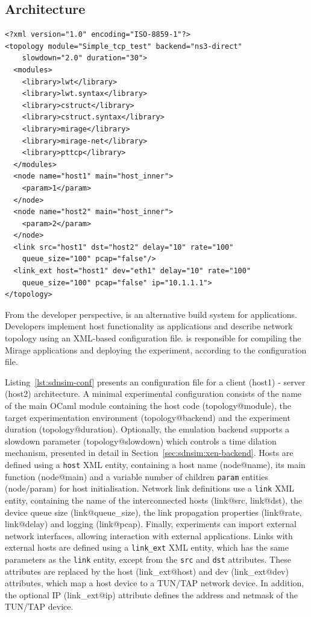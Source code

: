 \subsection{\sdnsim Architecture} \label{sec:sdnsim-design}

\lstset{language=XML,
numberstyle=\footnotesize,
basicstyle=\ttfamily\footnotesize,
captionpos=b,
}
\begin{lstlisting}[caption={A sample \sdnsim configuration file interconnecting
  a server and a client host},label={lst:sdnsim-conf}]
<?xml version="1.0" encoding="ISO-8859-1"?>
<topology module="Simple_tcp_test" backend="ns3-direct" 
    slowdown="2.0" duration="30">
  <modules>
    <library>lwt</library>
    <library>lwt.syntax</library>
    <library>cstruct</library>
    <library>cstruct.syntax</library>
    <library>mirage</library>
    <library>mirage-net</library>
    <library>pttcp</library>
  </modules>
  <node name="host1" main="host_inner"> 
    <param>1</param>
  </node>
  <node name="host2" main="host_inner"> 
    <param>2</param>
  </node>
  <link src="host1" dst="host2" delay="10" rate="100" 
    queue_size="100" pcap="false"/>
  <link_ext host="host1" dev="eth1" delay="10" rate="100" 
    queue_size="100" pcap="false" ip="10.1.1.1">
</topology>
\end{lstlisting}

From the developer perspective, \sdnsim is an alternative build system for
\mirage applications. Developers implement host functionality as \mirage
applications and describe network topology using an XML-based configuration
file. \sdnsim is responsible for compiling the Mirage applications and deploying the
experiment, according to the configuration file. 

Listing~\ref{lst:sdnsim-conf} presents an \sdnsim configuration file for a
client (host1) - server (host2) architecture.  A minimal experimental
configuration consists of the name of the main OCaml module containing the host
code (topology@module), the target experimentation environment
(topology@backend) and the experiment duration (topology@duration).  Optionally,
the emulation backend supports a slowdown parameter (topology@slowdown) which
controls a time dilation mechanism, presented in detail in
Section~\ref{sec:sdnsim:xen-backend}.  Hosts are defined using a \texttt{host}
XML entity, containing a host name (node@name), its main function (node@main)
and a variable number of children \texttt{param} entities (node/param) for host
initialisation.  Network link definitions use a
\texttt{link} XML entity, containing the name of the interconnected hosts
(link@src, link@dst), the device queue size (link@queue\_size), the link
propagation properties (link@rate, link@delay) and logging 
(link@pcap).  Finally, experiments can import external network interfaces, 
allowing interaction with external applications.  Links with
external hosts are defined using a \texttt{link\_ext} XML entity, which has the
same parameters as the \texttt{link} entity, except from the \texttt{src} and
\texttt{dst} attributes.  These attributes are replaced by the host
(link\_ext@host) and dev (link\_ext@dev) attributes, which map a host device to
a TUN/TAP network device. In addition, the optional IP (link\_ext@ip) attribute
defines the address and netmask of the TUN/TAP device. 

